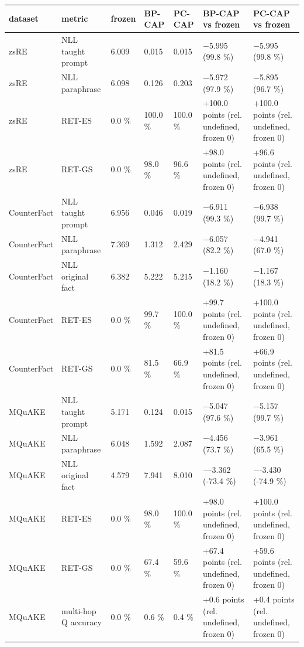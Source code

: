 \documentclass[10pt,a4paper]{article}
\begin{document}
\begin{center}\scriptsize
\begin{tabularx}{\textwidth}{@{}p{}XXXXXX@{}}
\toprule
dataset & metric & frozen & BP-CAP & PC-CAP & BP-CAP vs frozen & PC-CAP vs frozen \\ \midrule
zsRE & NLL taught prompt & 6.009 & 0.015 & 0.015 & $-$5.995 (99.8 \%) & $-$5.995 (99.8 \%) \\
zsRE & NLL paraphrase & 6.098 & 0.126 & 0.203 & $-$5.972 (97.9 \%) & $-$5.895 (96.7 \%) \\
zsRE & RET-ES & 0.0 \% & 100.0 \% & 100.0 \% & +100.0 points (rel. undefined, frozen 0) & +100.0 points (rel. undefined, frozen 0) \\
zsRE & RET-GS & 0.0 \% & 98.0 \% & 96.6 \% & +98.0 points (rel. undefined, frozen 0) & +96.6 points (rel. undefined, frozen 0) \\
CounterFact & NLL taught prompt & 6.956 & 0.046 & 0.019 & $-$6.911 (99.3 \%) & $-$6.938 (99.7 \%) \\
CounterFact & NLL paraphrase & 7.369 & 1.312 & 2.429 & $-$6.057 (82.2 \%) & $-$4.941 (67.0 \%) \\
CounterFact & NLL original fact & 6.382 & 5.222 & 5.215 & $-$1.160 (18.2 \%) & $-$1.167 (18.3 \%) \\
CounterFact & RET-ES & 0.0 \% & 99.7 \% & 100.0 \% & +99.7 points (rel. undefined, frozen 0) & +100.0 points (rel. undefined, frozen 0) \\
CounterFact & RET-GS & 0.0 \% & 81.5 \% & 66.9 \% & +81.5 points (rel. undefined, frozen 0) & +66.9 points (rel. undefined, frozen 0) \\
MQuAKE & NLL taught prompt & 5.171 & 0.124 & 0.015 & $-$5.047 (97.6 \%) & $-$5.157 (99.7 \%) \\
MQuAKE & NLL paraphrase & 6.048 & 1.592 & 2.087 & $-$4.456 (73.7 \%) & $-$3.961 (65.5 \%) \\
MQuAKE & NLL original fact & 4.579 & 7.941 & 8.010 & $-$-3.362 (-73.4 \%) & $-$-3.430 (-74.9 \%) \\
MQuAKE & RET-ES & 0.0 \% & 98.0 \% & 100.0 \% & +98.0 points (rel. undefined, frozen 0) & +100.0 points (rel. undefined, frozen 0) \\
MQuAKE & RET-GS & 0.0 \% & 67.4 \% & 59.6 \% & +67.4 points (rel. undefined, frozen 0) & +59.6 points (rel. undefined, frozen 0) \\
MQuAKE & multi-hop Q accuracy & 0.0 \% & 0.6 \% & 0.4 \% & +0.6 points (rel. undefined, frozen 0) & +0.4 points (rel. undefined, frozen 0) \\
\bottomrule
\end{tabularx}
\end{center}
\end{document}
